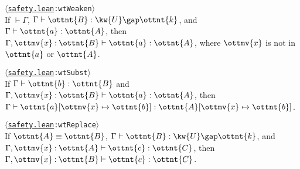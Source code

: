 \documentclass[a4paper,UKenglish,cleveref,autoref,thm-restate]{lipics-v2021}
\newcommand{\repo}{https://github.com/ionathanch/TTBFL}
\newcommand{\thmref}[2]{%
  $\langle$\href{\repo/tree/main/src/#1}{\texttt{#1}}\texttt{:#2}$\rangle$%
}
\begin{document}
\begin{lemma}[Weakening (w.t.)] \thmref{safety.lean}{wtWeaken} \label{lem:wt:weak} \\
  If $ \mathop{\vdash}  \Gamma $, $ \Gamma  \vdash  \ottnt{B}  \mathrel{:}   \kw{U} \gap  \ottnt{k}  $, and $ \Gamma  \vdash  \ottnt{a}  \mathrel{:}  \ottnt{A} $,
  then $  \Gamma ,  \ottmv{x}  \mathbin{:}  \ottnt{B}   \vdash  \ottnt{a}  \mathrel{:}  \ottnt{A} $, where $\ottmv{x}$ is not in $\ottnt{a}$ or $\ottnt{A}$.
\end{lemma}


\begin{lemma}[Substitution (w.t.)] \thmref{safety.lean}{wtSubst} \label{lem:wt:subst} \\
  If $ \Gamma  \vdash  \ottnt{b}  \mathrel{:}  \ottnt{B} $ and $  \Gamma ,  \ottmv{x}  \mathbin{:}  \ottnt{B}   \vdash  \ottnt{a}  \mathrel{:}  \ottnt{A} $,
  then $ \Gamma  \vdash   \ottnt{a} [  \ottmv{x}  \mapsto  \ottnt{b}  ]   \mathrel{:}   \ottnt{A} [  \ottmv{x}  \mapsto  \ottnt{b}  ]  $.
\end{lemma}


\begin{lemma}[Replacement (w.t.)] \thmref{safety.lean}{wtReplace} \label{lem:wt:replace} \\
  If $ \ottnt{A}  \equiv  \ottnt{B} $, $ \Gamma  \vdash  \ottnt{B}  \mathrel{:}   \kw{U} \gap  \ottnt{k}  $, and $  \Gamma ,  \ottmv{x}  \mathbin{:}  \ottnt{A}   \vdash  \ottnt{c}  \mathrel{:}  \ottnt{C} $,
  then $  \Gamma ,  \ottmv{x}  \mathbin{:}  \ottnt{B}   \vdash  \ottnt{c}  \mathrel{:}  \ottnt{C} $.
\end{lemma}

\end{document}
